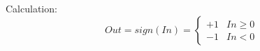 Calculation:
\begin{equation*}
	Out = sign(In) = \begin{cases}+1 & In \ge 0 \\ -1 & In < 0\end{cases}
\end{equation*}

